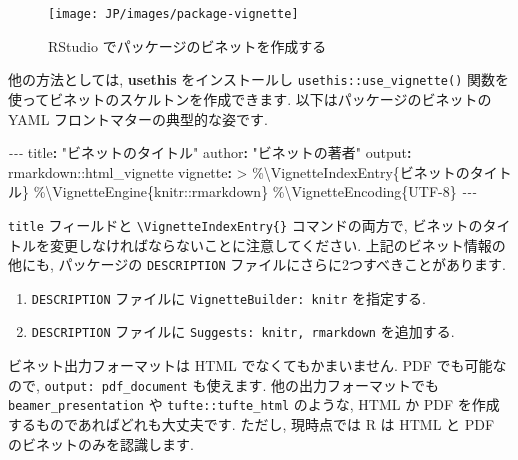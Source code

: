 \documentclass[
  11pt,
  lualatex,ja=standard,jafont=noto]{bxjsreport}
\newenvironment{Shaded}{\begin{snugshade}}{\end{snugshade}}
\newcommand{\AttributeTok}[1]{\textcolor[rgb]{0.77,0.63,0.00}{#1}}
\newcommand{\CharTok}[1]{\textcolor[rgb]{0.31,0.60,0.02}{#1}}
\newcommand{\FunctionTok}[1]{\textcolor[rgb]{0.00,0.00,0.00}{#1}}
\newcommand{\KeywordTok}[1]{\textcolor[rgb]{0.13,0.29,0.53}{\textbf{#1}}}
\newcommand{\NormalTok}[1]{#1}
\newcommand{\PreprocessorTok}[1]{\textcolor[rgb]{0.56,0.35,0.01}{\textit{#1}}}
\newcommand{\StringTok}[1]{\textcolor[rgb]{0.31,0.60,0.02}{#1}}
\begin{document}
\begin{figure}

{\centering \texttt{[image: JP/images/package-vignette]} 

}

\caption{RStudio でパッケージのビネットを作成する}\label{fig:package-vignette}
\end{figure}

他の方法としては, \textbf{usethis} \autocite{R-usethis} をインストールし \texttt{usethis::use\_vignette()} 関数を使ってビネットのスケルトンを作成できます. 以下はパッケージのビネットの YAML フロントマターの典型的な姿です.

\begin{Shaded}
\begin{Highlighting}[]
\PreprocessorTok{{-}{-}{-}}
\FunctionTok{title}\KeywordTok{:}\AttributeTok{ }\StringTok{"ビネットのタイトル"}
\FunctionTok{author}\KeywordTok{:}\AttributeTok{ }\StringTok{"ビネットの著者"}
\FunctionTok{output}\KeywordTok{:}\AttributeTok{ rmarkdown::html\_vignette}
\FunctionTok{vignette}\KeywordTok{: }\CharTok{\textgreater{}}
\NormalTok{  \%\textbackslash{}VignetteIndexEntry\{ビネットのタイトル\}}
\NormalTok{  \%\textbackslash{}VignetteEngine\{knitr::rmarkdown\}}
\NormalTok{  \%\textbackslash{}VignetteEncoding\{UTF{-}8\}}
\PreprocessorTok{{-}{-}{-}}
\end{Highlighting}
\end{Shaded}

\texttt{title} フィールドと \texttt{\textbackslash{}VignetteIndexEntry\{\}} コマンドの両方で, ビネットのタイトルを変更しなければならないことに注意してください. 上記のビネット情報の他にも, パッケージの \texttt{DESCRIPTION} ファイルにさらに2つすべきことがあります.

\begin{enumerate}
\def\labelenumi{\arabic{enumi}.}
\item
  \texttt{DESCRIPTION} ファイルに \texttt{VignetteBuilder: knitr} を指定する.
\item
  \texttt{DESCRIPTION} ファイルに \texttt{Suggests: knitr, rmarkdown} を追加する.
\end{enumerate}

ビネット出力フォーマットは HTML でなくてもかまいません. PDF でも可能なので, \texttt{output: pdf\_document} も使えます. 他の出力フォーマットでも \texttt{beamer\_presentation} や \texttt{tufte::tufte\_html} のような, HTML か PDF を作成するものであればどれも大丈夫です. ただし, 現時点では R は HTML と PDF のビネットのみを認識します.
\end{document}
